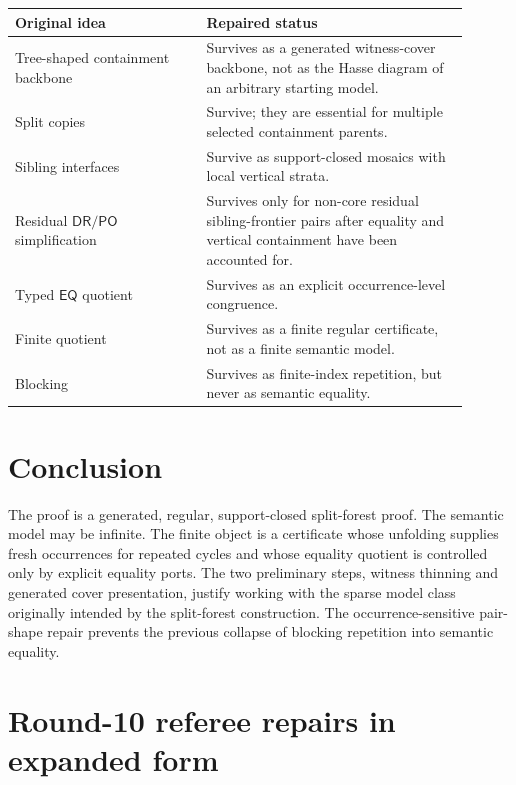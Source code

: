 \documentclass[11pt]{article}
\newcommand{\EQ}{\mathsf{EQ}}
\newcommand{\DR}{\mathsf{DR}}
\newcommand{\PO}{\mathsf{PO}}
\begin{document}
\begin{center}
\begin{tabular}{p{0.38\linewidth}p{0.52\linewidth}}
\toprule
Original idea & Repaired status \\
\midrule
Tree-shaped containment backbone & Survives as a generated witness-cover backbone, not as the Hasse diagram of an arbitrary starting model. \\
Split copies & Survive; they are essential for multiple selected containment parents. \\
Sibling interfaces & Survive as support-closed mosaics with local vertical strata. \\
Residual $\DR/\PO$ simplification & Survives only for non-core residual sibling-frontier pairs after equality and vertical containment have been accounted for. \\
Typed $\EQ$ quotient & Survives as an explicit occurrence-level congruence. \\
Finite quotient & Survives as a finite regular certificate, not as a finite semantic model. \\
Blocking & Survives as finite-index repetition, but never as semantic equality. \\
\bottomrule
\end{tabular}
\end{center}

\section{Conclusion}

The proof is a generated, regular, support-closed split-forest proof.  The semantic model may be infinite.  The finite object is a certificate whose unfolding supplies fresh occurrences for repeated cycles and whose equality quotient is controlled only by explicit equality ports.  The two preliminary steps, witness thinning and generated cover presentation, justify working with the sparse model class originally intended by the split-forest construction.  The occurrence-sensitive pair-shape repair prevents the previous collapse of blocking repetition into semantic equality.

\appendix

\section{Round-10 referee repairs in expanded form}
\end{document}
